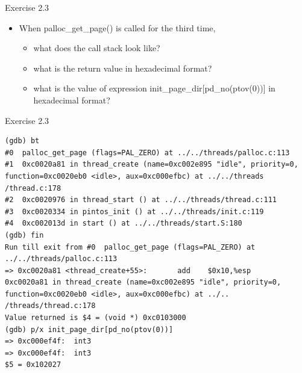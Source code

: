 \documentclass[14pt]{beamer}
\begin{document}
\begin{frame}[fragile]{Exercise 2.3}
\begin{itemize}
    \item When palloc\_get\_page() is called for the third time,
\begin{itemize}
    \item what does the call stack look like?

\item what is the return value in hexadecimal format?

\item what is the value of expression init\_page\_dir[pd\_no(ptov(0))] in hexadecimal format?
\end{itemize}

\end{itemize}

\end{frame}
\begin{frame}[fragile]{Exercise 2.3}
\begin{block}{}
\begin{lstlisting}
(gdb) bt
#0  palloc_get_page (flags=PAL_ZERO) at ../../threads/palloc.c:113
#1  0xc0020a81 in thread_create (name=0xc002e895 "idle", priority=0, 
function=0xc0020eb0 <idle>, aux=0xc000efbc) at ../../threads
/thread.c:178
#2  0xc0020976 in thread_start () at ../../threads/thread.c:111
#3  0xc0020334 in pintos_init () at ../../threads/init.c:119
#4  0xc002013d in start () at ../../threads/start.S:180
(gdb) fin
Run till exit from #0  palloc_get_page (flags=PAL_ZERO) at 
../../threads/palloc.c:113
=> 0xc0020a81 <thread_create+55>:       add    $0x10,%esp
0xc0020a81 in thread_create (name=0xc002e895 "idle", priority=0, 
function=0xc0020eb0 <idle>, aux=0xc000efbc) at ../..
/threads/thread.c:178
Value returned is $4 = (void *) 0xc0103000
(gdb) p/x init_page_dir[pd_no(ptov(0))]
=> 0xc000ef4f:  int3   
=> 0xc000ef4f:  int3   
$5 = 0x102027
\end{lstlisting}
\end{block}
\end{frame}
\end{document}
